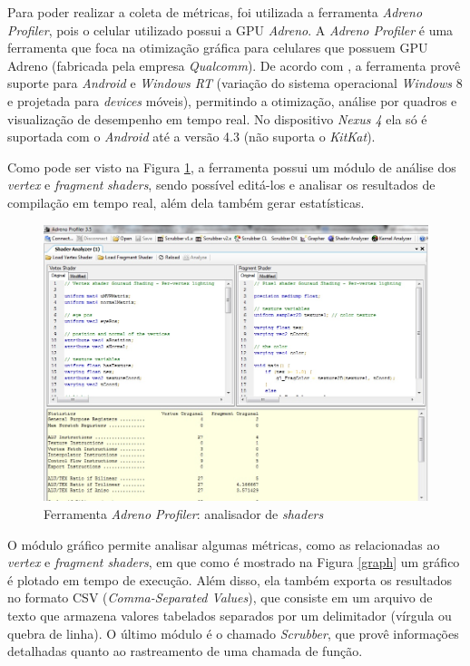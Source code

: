 	Para poder realizar a coleta de métricas, foi utilizada a ferramenta \textit{Adreno Profiler}, pois o celular utilizado possui a GPU \textit{Adreno}. A \textit{Adreno Profiler} é uma ferramenta que foca na otimização gráfica para celulares que possuem GPU Adreno (fabricada pela empresa \textit{Qualcomm}). De acordo com  \cite{adp}, a ferramenta provê suporte para \textit{Android} e \textit{Windows RT} (variação do sistema operacional \textit{Windows} 8  e projetada para \textit{devices} móveis), permitindo a otimização, análise por quadros e visualização de desempenho em tempo real. No dispositivo \textit{Nexus 4} ela só é suportada com o \textit{Android} até a versão 4.3 (não suporta o \textit{KitKat}). 

	Como pode ser visto na Figura \ref{adrenoProfiler}, a ferramenta possui um módulo de análise dos \textit{vertex} e \textit{fragment} \textit{shaders}, sendo possível editá-los e analisar os resultados de compilação em tempo real, além dela também gerar estatísticas.  

	\begin{figure}[h]
	\centering
		\includegraphics[keepaspectratio=true,scale=0.4]{figuras/shader_analyzer.jpg}
	\caption{Ferramenta \textit{Adreno Profiler}: analisador de \textit{shaders}}
	\label{adrenoProfiler}
	\end{figure}

	O módulo gráfico permite analisar algumas métricas, como as relacionadas ao \textit{vertex} e \textit{fragment shaders}, em que como é mostrado na Figura \ref{graph} um gráfico é plotado em tempo de execução. Além disso, ela também exporta os resultados no formato CSV (\textit{Comma-Separated Values}), que consiste em um arquivo de texto que armazena valores tabelados separados por um delimitador (vírgula ou quebra de linha). O último módulo é o chamado \textit{Scrubber}, que provê informações detalhadas quanto ao rastreamento de uma chamada de função. 

